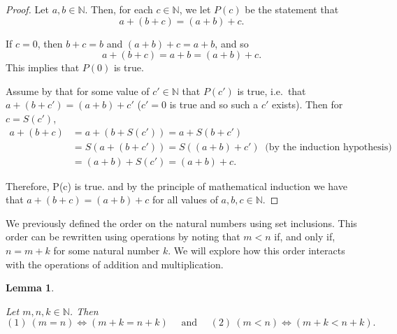 \documentclass[
]{book}
\newtheorem{lemma}{Lemma}[chapter]
\theoremstyle{definition}
\theoremstyle{definition}
\theoremstyle{definition}
\theoremstyle{definition}
\theoremstyle{remark}
\begin{document}
\begin{proof}

Let \(a,b \in \mathbb{N}\). Then, for each \(c\in \mathbb{N}\), we let \(P(c)\) be the statement that
\[a+(b+c) = (a+b) + c.\]

If \(c=0\), then \(b+c=b\) and \((a+b)+c=a+b\), and so
\[a+(b+c)=a+b= (a+b)+c.\] This implies that \(P(0)\) is true.

Assume by that for some value of \(c'\in \mathbb{N}\) that \(P(c')\) is true, i.e.~that \(a+(b+c')=(a+b)+c'\) (\(c'=0\) is true and so such a \(c'\) exists). Then for \(c=S(c')\),
\begin{align*}
    a+(b+c) &= a+(b+S(c'))=a+S(b+c') \\
    &= S(a+(b+c')) = S((a+b)+c') \: \mbox{ (by the induction hypothesis)}\\
    &= (a+b)+S(c') = (a+b)+c.
\end{align*}

Therefore, P(c) is true. and by the principle of mathematical induction we have that \(a+(b+c)=(a+b)+c\) for all values of \(a,b,c\in \mathbb{N}\).

\end{proof}

We previously defined the order on the natural numbers using set inclusions. This order can be rewritten using operations by noting that \(m<n\) if, and only if, \(n=m+k\) for some natural number \(k\). We will explore how this order interacts with the operations of addition and multiplication.

\begin{lemma}
\protect\hypertarget{lem:order-addition-naturals}{}\label{lem:order-addition-naturals}

Let \(m,n,k\in \mathbb{N}\). Then \[ (1) \: (m=n) \Leftrightarrow (m+k=n+k) \quad \mbox{ and } \quad (2) \: (m<n) \Leftrightarrow (m+k<n+k).\]

\end{lemma}
\end{document}
